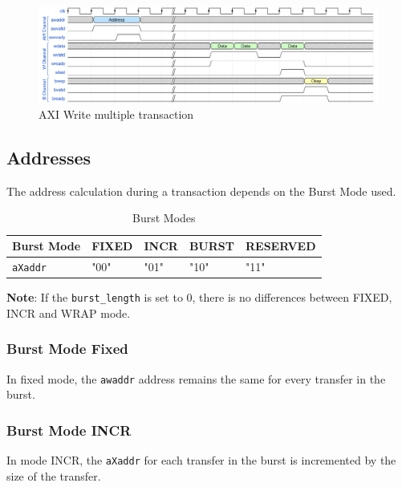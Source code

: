 \begin{figure}[H]
    \centering
    \includegraphics[width=\linewidth]{images/axi/axi_single_write_multiple.png}
    \caption{AXI Write multiple transaction}
\end{figure}

\newpage
\subsection{Addresses} \label{Addresses}

The address calculation during a transaction depends on the Burst Mode used.

\begin{table}[H]
\begin{threeparttable}
\caption{Burst Modes}
\begin{tabularx}{\linewidth}{X | X | X | X | X}
Burst Mode                  & FIXED & INCR & BURST & RESERVED \\ 
\hline        
\texttt{aXaddr}   & "00"  & "01" & "10"  & "11"     \\
\end{tabularx}
\end{threeparttable}
\end{table}

\textbf{Note}: If the \texttt{burst_length} is set to 0, there is no differences between FIXED, INCR and WRAP mode.

\subsubsection{Burst Mode Fixed}

In fixed mode, the \texttt{awaddr} address remains the same for every transfer in the burst.

\subsubsection{Burst Mode INCR}

In mode INCR, the \texttt{aXaddr} for each transfer in the burst is incremented by the size of the transfer.

